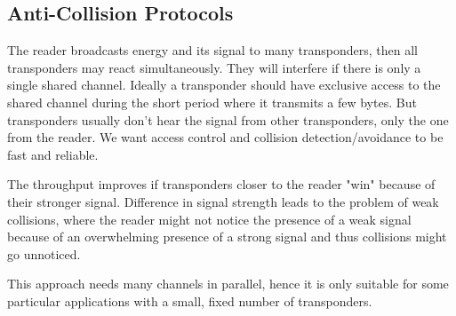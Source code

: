 \subsection{Anti-Collision Protocols}
\begin{mytitle} The reader broadcasts energy and its signal to many transponders, then all transponders may react simultaneously. They will interfere if there is only a single shared channel. Ideally a transponder should have exclusive access to the shared channel during the short period where it transmits a few bytes. But transponders usually don't hear the signal from other transponders, only the one from the reader. We want access control and collision detection/avoidance to be fast and reliable.
\end{mytitle}
\begin{mytitle} The throughput improves if transponders closer to the reader "win" because of their stronger signal. Difference in signal strength leads to the problem of weak collisions, where the reader might not notice the presence of a weak signal because of an overwhelming presence of a strong signal and thus collisions might go unnoticed.
\end{mytitle}
\begin{mytitle} This approach needs many channels in parallel, hence it is only suitable for some particular applications with a small, fixed number of transponders.
\end{mytitle}
